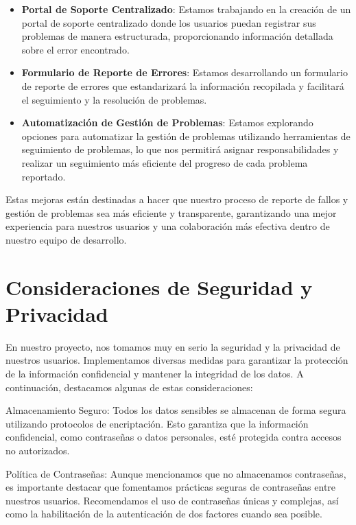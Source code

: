 \documentclass{article}
\begin{document}
\begin{itemize}
    \item \textbf{Portal de Soporte Centralizado}: Estamos trabajando en la creación de un portal de soporte centralizado donde los usuarios puedan registrar sus problemas de manera estructurada, proporcionando información detallada sobre el error encontrado.
    
    \item \textbf{Formulario de Reporte de Errores}: Estamos desarrollando un formulario de reporte de errores que estandarizará la información recopilada y facilitará el seguimiento y la resolución de problemas.
    
    \item \textbf{Automatización de Gestión de Problemas}: Estamos explorando opciones para automatizar la gestión de problemas utilizando herramientas de seguimiento de problemas, lo que nos permitirá asignar responsabilidades y realizar un seguimiento más eficiente del progreso de cada problema reportado.
\end{itemize}

Estas mejoras están destinadas a hacer que nuestro proceso de reporte de fallos y gestión de problemas sea más eficiente y transparente, garantizando una mejor experiencia para nuestros usuarios y una colaboración más efectiva dentro de nuestro equipo de desarrollo.



\section{Consideraciones de Seguridad y Privacidad}

En nuestro proyecto, nos tomamos muy en serio la seguridad y la privacidad de nuestros usuarios. Implementamos diversas medidas para garantizar la protección de la información confidencial y mantener la integridad de los datos. A continuación, destacamos algunas de estas consideraciones:

    Almacenamiento Seguro: Todos los datos sensibles se almacenan de forma segura utilizando protocolos de encriptación. Esto garantiza que la información confidencial, como contraseñas o datos personales, esté protegida contra accesos no autorizados.

    Política de Contraseñas: Aunque mencionamos que no almacenamos contraseñas, es importante destacar que fomentamos prácticas seguras de contraseñas entre nuestros usuarios. Recomendamos el uso de contraseñas únicas y complejas, así como la habilitación de la autenticación de dos factores cuando sea posible.
\end{document}
